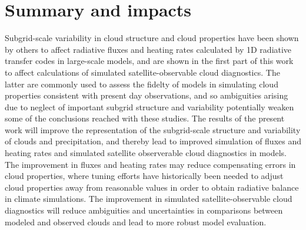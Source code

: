 \documentclass[letter]{article}
\begin{document}

\section{Summary and impacts}
Subgrid-scale variability in cloud structure and cloud properties have been shown by others to affect radiative fluxes and heating rates calculated by 1D radiative transfer codes in large-scale models, and are shown in the first part of this work to affect calculations of simulated satellite-observable cloud diagnostics. The latter are commonly used to assess the fidelty of models in simulating cloud properties consistent with present day observations, and so ambiguities arising due to neglect of important subgrid structure and variability potentially weaken some of the conclusions reached with these studies. The results of the present work will improve the representation of the subgrid-scale structure and variability of clouds and precipitation, and thereby lead to improved simulation of fluxes and heating rates and simulated satellite observerable cloud diagnostics in models. The improvement in fluxes and heating rates may reduce compensating errors in cloud properties, where tuning efforts have historically been needed to adjust cloud properties away from reasonable values in order to obtain radiative balance in climate simulations. The improvement in simulated satellite-observable cloud diagnostics will reduce ambiguities and uncertainties in comparisons between modeled and observed clouds and lead to more robust model evaluation.


\end{document}
